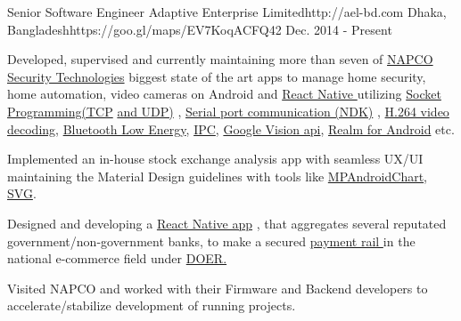 

\begin{workentries}

\workentry
{Senior Software Engineer} %
{Adaptive Enterprise Limited}{http://ael-bd.com} %
{Dhaka, Bangladesh}{https://goo.gl/maps/EV7KoqACFQ42} %
{Dec. 2014 - Present} %
{
  \begin{workitems} %
    \item {Developed, supervised and currently maintaining more than seven of
    {\href{http://www.napcosecurity.com}{NAPCO Security Technologies}}
    biggest state of the art apps to manage home security, home automation, video cameras on Android and 
    {\href{https://facebook.github.io/react-native/}{React Native }}
    utilizing 
    {\href{https://www.geeksforgeeks.org/socket-programming-in-java/}{Socket Programming(TCP}}
    {\href{https://www.geeksforgeeks.org/working-udp-datagramsockets-java/}{and UDP)}}
    , 
    {\href{https://github.com/cepr/android-serialport-api/tree/master/android-serialport-api/project}{Serial port communication (NDK)}}
    , 
    {\href{https://ieeexplore.ieee.org/document/1410457}{H.264 video decoding}}, 
    {\href{https://en.wikipedia.org/wiki/Bluetooth_Low_Energy}{Bluetooth Low Energy}}, 
    {\href{https://developer.android.com/guide/components/aidl}{IPC}}, 
    {\href{https://developers.google.com/vision/}{Google Vision api}}, 
    {\href{https://realm.io}{Realm for Android}}
    etc.}
    \item {Implemented an in-house stock exchange analysis app with seamless UX/UI maintaining the Material Design guidelines with tools like
    {\href{https://github.com/PhilJay/MPAndroidChart}{MPAndroidChart}},
    {\href{https://www.sitepoint.com/svg-101-what-is-svg/}{SVG}.}
    }
    \item {Designed and developing a 
    {\href{https://facebook.github.io/react-native/}{React Native app}}
    , that aggregates several reputated government/non-government banks, to make a secured 
    {\href{https://www.paymentrails.com}{payment rail }}
    in the national 
    e-commerce field under 
    {\href{http://doer.com.bd}{DOER.}}
    }
    \item {Visited NAPCO and worked with their Firmware and Backend developers to accelerate/stabilize development of running projects.}
  \end{workitems}
}


\end{workentries}
